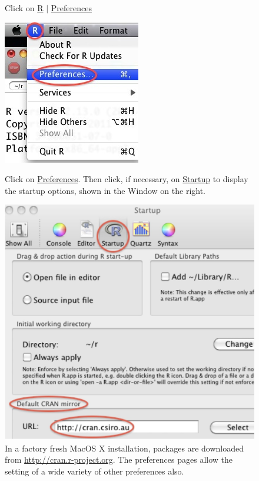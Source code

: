 \noindent
\begin{figure}[h]
 Click on \underline{R} $\mid$ \underline{Preferences}\\
\begin{minipage}[t]{0.31\textwidth}
\vspace*{0pt}

\includegraphics{figs-inc/16i-mac-rprefs.jpg}

Click on \underline{Preferences}.  Then click, if necessary, on
\underline{Startup} to display the startup options, shown in the
Window on the right.
\end{minipage}
\hspace*{0.02\textwidth}
\begin{minipage}[t]{0.655\textwidth}
\vspace*{0pt}

\includegraphics{figs-inc/16i-mac-rstartup.jpg}
\end{minipage}
\caption{In a factory fresh MacOS X installation, packages are
  downloaded from \url{http://cran.r-project.org}.  The preferences
  pages allow the setting of a wide variety of other preferences
  also.}
\end{figure}


